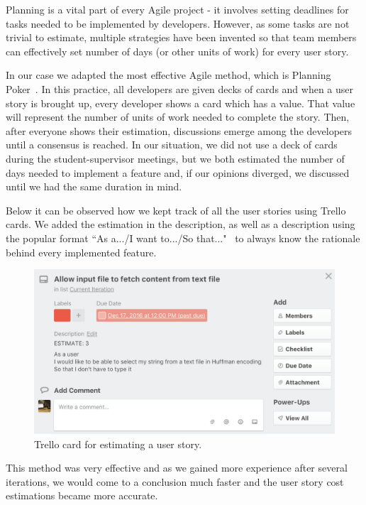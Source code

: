 \documentclass{l4proj}
\begin{document}
Planning is a vital part of every Agile project - it involves setting deadlines for tasks needed to be implemented by
developers. However, as some tasks are not trivial to estimate, multiple strategies have been invented so that team
members can effectively set number of days (or other units of work) for every user story.

In our case we adapted the most effective Agile method, which is
Planning Poker~\cite{planning-poker}. In this practice, all developers are given decks of cards and when a user story is brought up, every developer shows a card which has a value. That value will represent the number of units of work
needed to complete the story. Then, after everyone shows their estimation, discussions emerge among the developers until a consensus is reached. In our situation, we did not use a deck of cards during the student-supervisor meetings, but we both estimated the number of days needed to implement a feature and, if our opinions diverged, we discussed until we had the same duration in mind.

Below it can be observed how we kept track of all the user stories using Trello cards. We added the estimation in the
description, as well as a description using the popular format ``As a.../I want to.../So that..."~\cite{user-story-format} to always know the
rationale behind every implemented feature.

\pagebreak

\begin{figure}[!ht]
\centering
\includegraphics[scale=0.5]{estimation}
\caption{Trello card for estimating a user story.}
\label{fig:estimation}
\end{figure}

This method was very effective and as we gained more experience after several iterations, we would come to a conclusion
much faster and the user story cost estimations became more accurate.
\end{document}
